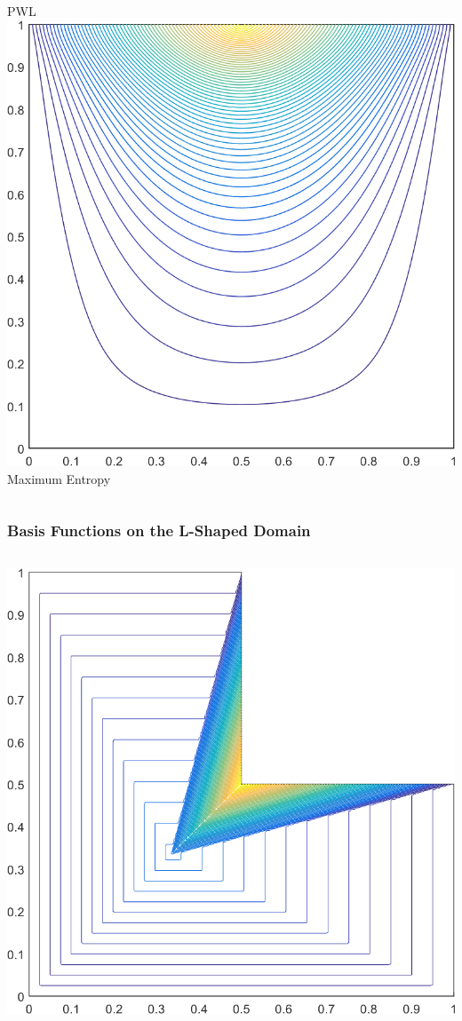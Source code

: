 \documentclass[compress,10pt]{beamer}
\begin{document}
\begin{frame}[t]
{\begin{columns}
PWL\\ \vspace{3mm}
{}\includegraphics[width=0.55\columnwidth]{images/deg_square_MAXENT1_contour_b4.png} \\
Maximum Entropy
\end{columns}
}
{
\frametitle{Basis Functions on the L-Shaped Domain}
\begin{columns}
\centering
{}\includegraphics[width=0.85\columnwidth]{images/L-domain_PWLD1_contour_b4.png} \\
\vspace{3mm}

\end{columns}}
\end{frame}
\end{document}
